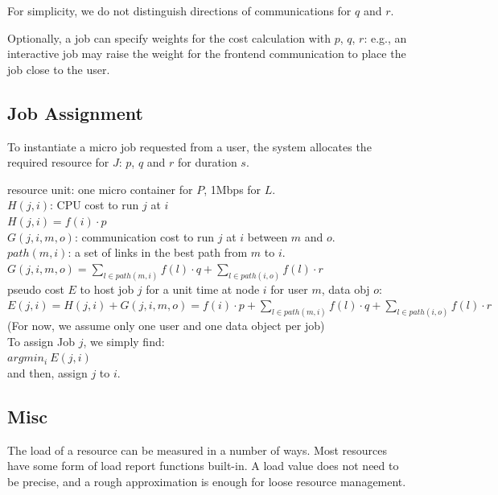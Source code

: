 For simplicity, we do not distinguish directions of communications for $q$ and $r$.

Optionally, a job can specify weights for the cost calculation with $p$, $q$, $r$:
e.g., an interactive job may raise the weight for the frontend
communication to place the job close to the user.

\subsection{Job Assignment}

To instantiate a micro job requested from a user, the system allocates
the required resource for $J$: $p$, $q$ and $r$ for duration $s$.



resource unit: one micro container for $P$, 1Mbps for $L$. \\
$H(j, i)$: CPU cost to run $j$ at $i$ \\
\( H(j, i) = f(i) \cdot p \)	\\
$G(j, i, m, o)$: communication cost to run $j$ at $i$ between $m$ and $o$. \\
$path(m,i)$: a set of links in the best path from $m$ to $i$. \\
\( G(j, i, m, o) = \sum_{l \in path(m,i)} f(l) \cdot q + \sum_{l \in path(i,o)} f(l) \cdot r \) \\
pseudo cost $E$ to host job $j$ for a unit time at node $i$ for user $m$, data obj $o$: \\
\( E(j, i)  =  H(j,i) + G(j,i,m,o) =  f(i) \cdot p + \sum_{l \in path(m,i)} f(l) \cdot q + \sum_{l \in path(i,o)} f(l) \cdot r \) \\
(For now, we assume only one user and one data object per job) \\
To assign Job $j$, we simply find: \\
\(  argmin_{i} \: E(j, i)   \)  \\
and then, assign $j$ to $i$. \\


\subsection{Misc}

The load of a resource can be measured in a number of ways.  Most
resources have some form of load report functions built-in.
A load value does not need to be precise, and a rough approximation is
enough for loose resource management.

